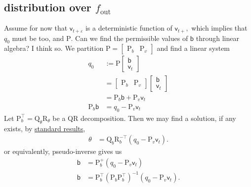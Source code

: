 \documentclass{article}
\newcommand{\mm}[1]{\mathrm{#1}}
\newcommand{\rv}[1]{\mathsf{#1}}
\newcommand{\lat}{\rv{b}}   %
\newcommand{\latst}{b}      %
\begin{document}
\subsection{distribution over $f_{\text{out}}$}
Assume for now that \(\rv{v}_{t+\varepsilon}\) is a deterministic function of \(\rv{v}_{t+},\) which implies that \(q_0\) must be too, and \(\mm{P}\).
Can we find the permissible values of \(\lat\) through  linear algebra?
I think so. We partition \(\mm{P}=\begin{bmatrix}
\mm{P}_{\latst} & \mm{P}_{v}\end{bmatrix}\) and find a linear system
\begin{align}
    q_0
    &:= \mm{P}\begin{bmatrix}
      \lat\\
      \rv{v}_{t}
    \end{bmatrix}\\
    &=\begin{bmatrix}
      \mm{P}_{\latst} &
      \mm{P}_{v}
    \end{bmatrix}\begin{bmatrix}
      \lat\\
      \rv{v}_{t}
    \end{bmatrix}\\
    &=
      \mm{P}_{\latst}\lat + 
      \mm{P}_{v}\rv{v}_{t}\\
    \mm{P}_{\latst}\lat &= q_0 - \mm{P}_{v}\rv{v}_{t}
\end{align}
Let \(\mm{P}_{\latst}^\top=\mm{Q}_\theta\mm{R}_\theta\) be a QR decomposition.
Then we may find a solution, if any exists, by  \href{https://math.stackexchange.com/a/2753878/110462}{standard results},
\begin{align}
    \theta &= \mm{Q}_{\latst}\mm{R}_{\latst}^{-\top}(q_0 - \mm{P}_{v}\rv{v}_{t}).
\end{align}
or equivalently, pseudo-inverse gives us
\begin{align}
    \lat &= \mm{P}_{\latst}^{+} (q_0 - \mm{P}_{v}\rv{v}_{t})\\
    \lat &= \mm{P}_{\latst}^{\top} (\mm{P}_{\latst}\mm{P}_{\latst}^{\top})^{-1} (q_0 - \mm{P}_{v}\rv{v}_{t}).
\end{align}
\end{document}
